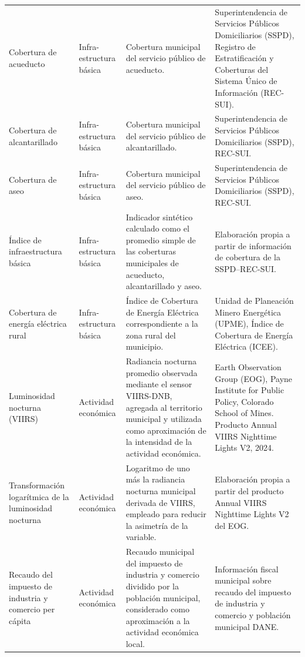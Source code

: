 \begin{longtable}{
>{\raggedright\arraybackslash}p{2.5cm}
>{\raggedright\arraybackslash}p{1.5cm}
>{\raggedright\arraybackslash}p{3.8cm}
>{\raggedright\arraybackslash}p{4.4cm}
}
Cobertura de acueducto
& Infra-estructura básica
& Cobertura municipal del servicio público de acueducto.
& Superintendencia de Servicios Públicos Domiciliarios (SSPD), Registro de Estratificación y Coberturas del Sistema Único de Información (REC-SUI). \\

Cobertura de alcantarillado
& Infra-estructura básica
& Cobertura municipal del servicio público de alcantarillado.
& Superintendencia de Servicios Públicos Domiciliarios (SSPD), REC-SUI. \\

Cobertura de aseo
& Infra-estructura básica
& Cobertura municipal del servicio público de aseo.
& Superintendencia de Servicios Públicos Domiciliarios (SSPD), REC-SUI. \\

Índice de infraestructura básica
& Infra-estructura básica
& Indicador sintético calculado como el promedio simple de las coberturas municipales de acueducto, alcantarillado y aseo.
& Elaboración propia a partir de información de cobertura de la SSPD--REC-SUI. \\

Cobertura de energía eléctrica rural
& Infra-estructura básica
& Índice de Cobertura de Energía Eléctrica correspondiente a la zona rural del municipio.
& Unidad de Planeación Minero Energética (UPME), Índice de Cobertura de Energía Eléctrica (ICEE). \\

Luminosidad nocturna (VIIRS)
& Actividad económica
& Radiancia nocturna promedio observada mediante el sensor VIIRS-DNB, agregada al territorio municipal y utilizada como aproximación de la intensidad de la actividad económica.
& Earth Observation Group (EOG), Payne Institute for Public Policy, Colorado School of Mines. Producto Annual VIIRS Nighttime Lights V2, 2024. \\

Transformación logarítmica de la luminosidad nocturna
& Actividad económica
& Logaritmo de uno más la radiancia nocturna municipal derivada de VIIRS, empleado para reducir la asimetría de la variable.
& Elaboración propia a partir del producto Annual VIIRS Nighttime Lights V2 del EOG. \\

Recaudo del impuesto de industria y comercio per cápita
& Actividad económica
& Recaudo municipal del impuesto de industria y comercio dividido por la población municipal, considerado como aproximación a la actividad económica local.
& Información fiscal municipal sobre recaudo del impuesto de industria y comercio y población municipal DANE. \\


\end{longtable}

